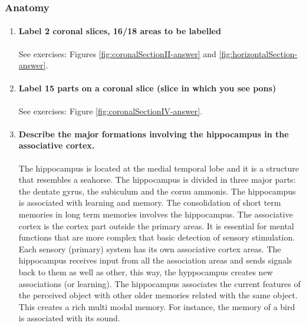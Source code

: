 \documentclass[12pt,article,oneside,a4paper]{memoir}
\begin{document}
\subsubsection{Anatomy}
\begin{enumerate}
\item \paragraph{Label 2 coronal slices, 16/18 areas to be labelled} See exercises: Figures \ref{fig:coronalSectionII-answer} and \ref{fig:horizontalSection-answer}.

\item \paragraph{Label 15 parts on a coronal slice (slice in which you see pons)} See exercises: Figure \ref{fig:coronalSectionIV-answer}.

\item \paragraph{Describe the major formations involving the hippocampus in the associative cortex.} 
The hippocampus is located at the medial temporal lobe and it is a structure that resembles a seahorse. The hippocampus is divided in three major parts: the dentate gyrus, the subiculum and the cornu ammonis. The hippocampus is associated with learning and memory. The consolidation of short term memories in long term memories involves the hippocampus.
The associative cortex is the cortex part outside the primary areas. It is essential for mental functions that are more complex that basic detection of sensory stimulation. Each sensory (primary) system has its own associative cortex areas.
The hippocampus receives input from all the association areas and sends signals back to them as well as other, this way, the hyppocampus creates new associations (or learning). The hippocampus associates the current features of the perceived object with other older memories related with the same object. This creates a rich multi modal memory. For instance, the memory of a bird is associated with its sound.


\end{enumerate}
\end{document}
